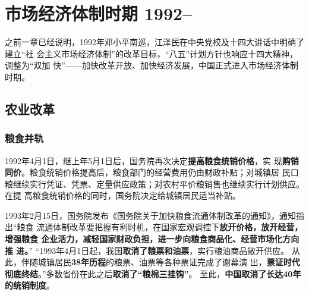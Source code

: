 \chapter{市场经济体制时期 1992--}

之前一章已经说明，1992年邓小平南巡，江泽民在中央党校及十四大讲话中明确了建立“社
会主义市场经济体制”的改革目标，“八五”计划方针也响应十四大精神，调整为“双加
快”——加快改革开放、加快经济发展，中国正式进入市场经济体制时期。


\section{农业改革}

% 









\subsection{粮食并轨}

1992年4月1日，继上年5月1日后，国务院再次决定\textbf{提高粮食统销价格}，实
现\textbf{购销同价}。粮食统销价格提高后，粮食部门的经营费用仍由财政补贴；对城镇居
民口粮继续实行凭证、凭票、定量供应政策；对农村平价粮销售也继续实行计划供应。在提
高粮食统销价格的同时，国务院决定给城镇居民适当补贴。

1993年2月15日，国务院发布《国务院关于加快粮食流通体制改革的通知》，通知指出“粮食
流通体制改革要把握有利时机，在国家宏观调控下\textbf{放开价格，放开经营，增强粮食
  企业活力，减轻国家财政负担，进一步向粮食商品化、经营市场化方向推
  进。}” “1993年4月1日起，我国\textbf{取消了粮票和油票}，实行粮油商品敞开供应。
从此，伴随城镇居民\textbf{38年历程}的粮票、油票等各种票证完成了谢幕演
出，\textbf{票证时代彻底终结}。”多数省份在此之后\textbf{取消了“粮棉三挂钩”}。
至此，\textbf{中国取消了长达40年的统销制度}。

